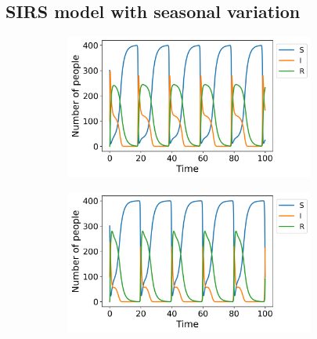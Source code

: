\documentclass[../main.tex]{subfiles}
\begin{document}
\subsection{SIRS model with seasonal variation}
\begin{figure}[htb!]
    \centering
    \begin{subfigure}[b]{0.475\textwidth}
    \centering
    \includegraphics[width=0.9\textwidth]{../figures/SIRS_harmonical_rk4_b=1.png}
    \caption{}
    \label{fig:seasonal_b=1}
    \end{subfigure}
    \quad
    \begin{subfigure}[b]{0.475\textwidth}
    \includegraphics[width=0.9\textwidth]{../figures/SIRS_harmonical_rk4_b=2.png}
    \caption{}
    \label{fig:seasonal_b=2}
    \end{subfigure}
    

\end{figure}
\end{document}

